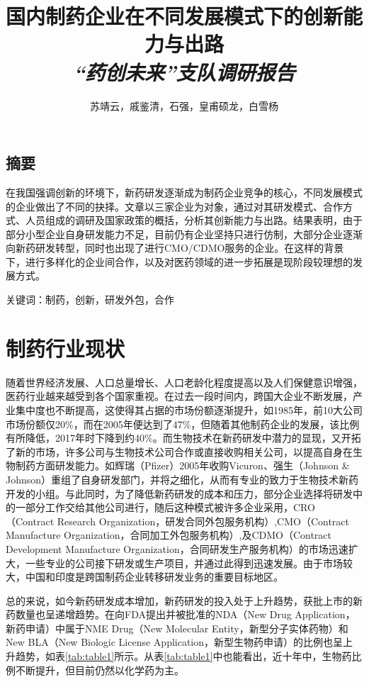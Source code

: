 \documentclass[twocolumn,openany]{ctexbook}
\title{\textbf{国内制药企业在不同发展模式下的创新能力与出路}\\{\textit{“药创未来”支队调研报告}}}
\author{苏靖云，戚鉴清，石强，皇甫硕龙，白雪杨}
\begin{document}
\frontmatter
\onecolumn

\begin{spacing}{2.0}
\chapter{摘要}

在我国强调创新的环境下，新药研发逐渐成为制药企业竞争的核心，不同发展模式的企业做出了不同的抉择。文章以三家企业为对象，通过对其研发模式、合作方式、人员组成的调研及国家政策的概括，分析其创新能力与出路。结果表明，由于部分小型企业自身研发能力不足，目前仍有企业坚持只进行仿制，大部分企业逐渐向新药研发转型，同时也出现了进行CMO/CDMO服务的企业。在这样的背景下，进行多样化的企业间合作，以及对医药领域的进一步拓展是现阶段较理想的发展方式。

关键词：制药，创新，研发外包，合作

\tableofcontents

\end{spacing}	

\twocolumn
\mainmatter

\chapter{制药行业现状}

随着世界经济发展、人口总量增长、人口老龄化程度提高以及人们保健意识增强，医药行业越来越受到各个国家重视。在过去一段时间内，跨国大企业不断发展，产业集中度也不断提高，这使得其占据的市场份额逐渐提升，如1985年，前10大公司市场份额仅20\%，而在2005年便达到了47\%\citep{RN7}，但随着其他制药企业的发展，该比例有所降低，2017年时下降到约40\%\citep{RN1}。而生物技术在新药研发中潜力的显现，又开拓了新的市场，许多公司与生物技术公司合作或直接收购相关公司，以提高自身在生物制药方面研发能力\citep{RN8}。如辉瑞（Pfizer）2005年收购Vicuron、强生（Johnson \& Johnson）重组了自身研发部门，并将之细化，从而有专业的致力于生物技术新药开发的小组。与此同时，为了降低新药研发的成本和压力，部分企业选择将研发中的一部分工作交给其他公司进行，随后这种模式被许多企业采用，CRO（Contract Research Organization，研发合同外包服务机构）,CMO（Contract Manufacture Organization，合同加工外包服务机构）,及CDMO（Contract Development Manufacture Organization，合同研发生产服务机构）的市场迅速扩大\citep{RN2}，一些专业的公司接下研发或生产项目，并通过此得到迅速发展。由于市场较大，中国和印度是跨国制药企业转移研发业务的重要目标地区\citep{RN7}。

总的来说，如今新药研发成本增加，新药研发的投入处于上升趋势，获批上市的新药数量也呈递增趋势\citep{RN6}。在向FDA提出并被批准的NDA（New Drug Application，新药申请）中属于NME Drug（New Molecular Entity，新型分子实体药物）和New BLA（New Biologic License Application，新型生物药申请）的比例也呈上升趋势，如表\ref{tab:table1}所示\citep{RN15,RN16,RN17,RN18}。从表\ref{tab:table1}中也能看出，近十年中，生物药比例不断提升，但目前仍然以化学药为主。
\end{document}
